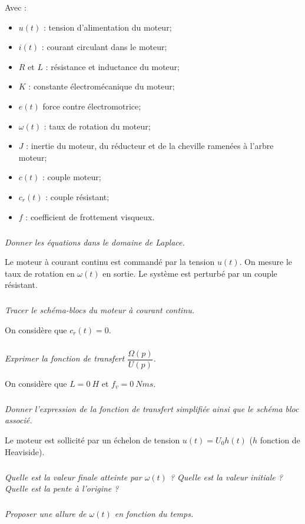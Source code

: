 \documentclass[10pt,fleqn]{article} %
\begin{document}
\begin{multicols}{2}
Avec :
\begin{itemize}
\item $u(t)$ : tension d'alimentation du moteur;
\item $i(t)$ : courant circulant dans le moteur;
\item $R$ et $L$ : résistance et inductance du moteur;
\item $K$ : constante électromécanique du moteur;
\item $e(t)$ force contre électromotrice;
\item $\omega(t)$ : taux de rotation du moteur;
\item $J$ : inertie du moteur, du réducteur et de la cheville ramenées à l'arbre moteur;
\item $c(t)$ : couple moteur; 
\item $c_r(t)$ : couple résistant; 
\item $f$ : coefficient de frottement visqueux.
\end{itemize}



\subparagraph{}\textit{Donner les équations dans le domaine de Laplace.}

\vspace{.25cm}

Le moteur à courant continu est commandé par la tension $u(t)$. On mesure le taux de rotation en $\omega(t)$ en sortie. Le système est perturbé par un couple résistant. 

\subparagraph{}\textit{Tracer le schéma-blocs du moteur à courant continu.}

\vspace{.25cm}

On considère que $c_r(t)=0$.

\subparagraph{}\textit{Exprimer la fonction de transfert $\dfrac{\Omega(p)}{U(p)}$.}


\vspace{.25cm}

On considère que $L=\SI{0}{H}$ et $f_v=\SI{0}{Nms}$.

\subparagraph{}\textit{Donner l'expression de la fonction de transfert simplifiée ainsi que le schéma bloc associé.}


Le moteur est sollicité par un échelon de tension $u(t)=U_0 h(t)$ ($h$ fonction de Heaviside).

\subparagraph{}\textit{Quelle est la valeur finale atteinte par $\omega(t)$ ? Quelle est la valeur initiale ? Quelle est la pente à l'origine ?}

\subparagraph{}\textit{Proposer une allure de $\omega(t)$ en fonction du temps.}



\end{multicols}
\end{document}
